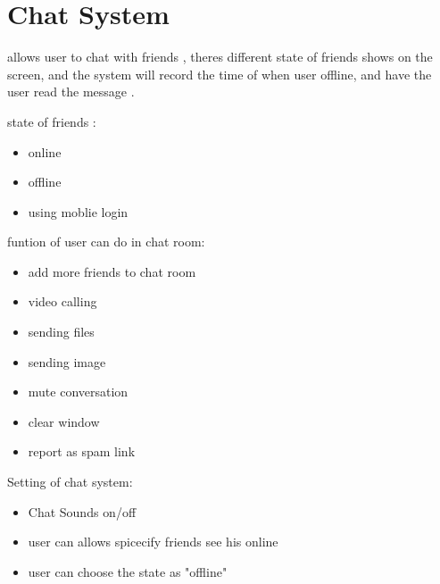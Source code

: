 \section{Chat System}
allows user to chat with friends , theres different state of friends shows on the screen, and the system will record the time of when user offline, and have the user read the message .

state of friends :
\begin{itemize}
\item online 
\item offline 
\item using moblie login
\end{itemize}

funtion of user can do in chat room:
\begin{itemize}
\item add more friends to chat room
\item video calling
\item sending files
\item sending image
\item mute conversation 
\item clear window
\item report as spam link
\end{itemize}

Setting of chat system:
\begin{itemize}
\item Chat Sounds {on/off}
\item user can allows spicecify friends see his online
\item user can choose the state as "offline"
\end{itemize}
